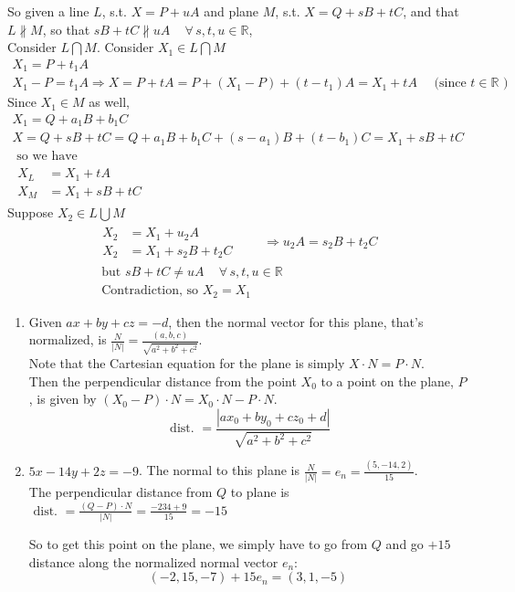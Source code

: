 \documentclass[twoside]{amsart}
\theoremstyle{plain}
\theoremstyle{definition}
\newcommand{\exercisehead}[1]
  {\smallskip
   \noindent{\small\bf Exercise #1.}}
\begin{document}
\exercisehead{18} So given a line $L$, s.t. $X = P + u A$ and plane $M$, s.t. $X = Q + sB + tC$, and that \\
$L \nparallel M$, so that $sB + tC \nparallel u A \quad \, \forall \, s, t, u \in \mathbb{R}$,  \\

Consider $L\bigcap M$.  Consider $X_1 \in L \bigcap M$
\[
\begin{gathered}
  X_1 = P + t_1 A \\
  X_1 - P = t_1 A \Longrightarrow X = P + tA = P + (X_1 - P) + (t-t_1) A = X_1 + t A \quad \text{ (since $t\in \mathbb{R}$ ) }
\end{gathered}
\]
Since $X_1 \in M$ as well, 
\[
\begin{gathered}
  X_1 = Q + a_1 B + b_1 C \\
  X = Q + sB + tC = Q + a_1 B + b_1 C + (s-a_1)B + (t-b_1)C = X_1 + sB + t C \\
  \text{ so we have } \\
  \begin{aligned}
    X_L & = X_1 + tA \\
    X_M & = X_1 + sB + tC 
  \end{aligned}
\end{gathered}
\]
Suppose $X_2 \in L \bigcup M$
\[
\begin{gathered}
  \begin{aligned}
    X_2 & = X_1 + u_2 A \\
    X_2 & = X_1 + s_2 B + t_2 C 
  \end{aligned} \quad \quad \Longrightarrow u_2 A = s_2 B + t_2 C \\
  \text{ but } sB + tC \neq u A \quad \, \forall \, s,t,u \in \mathbb{R} \\
  \text{ Contradiction, so $X_2 = X_1$ }
\end{gathered}
\]

\exercisehead{19}
\begin{enumerate}
\item Given $ax + by + cz = -d$, then the normal vector for this plane, that's normalized, is $\frac{ N}{|N|} = \frac{ (a,b,c)}{ \sqrt{ a^2 + b^2 + c^2 } }$.  \smallskip \\
Note that the Cartesian equation for the plane is simply $X \cdot N = P \cdot N$. \smallskip \\
Then the perpendicular distance from the point $X_0$ to a point on the plane, $P$, is given by $(X_0 - P) \cdot N = X_0 \cdot N - P \cdot N$.  
\[
\text{ dist. } = \frac{ |a x_0 + b y_0 + cz_0 + d | }{ \sqrt{ a^2 + b^2 + c^2 } }
\]
\item $5x - 14y + 2z = -9$.  The normal to this plane is $\frac{N}{|N|} = e_n = \frac{ (5,-14,2)}{15} $.  \smallskip \\
  The perpendicular distance from $Q$ to plane is $\text{ dist. } = \frac{ (Q-P)\cdot N}{ |N|} = \frac{ -234 + 9}{15 } = -15$ 

So to get this point on the plane, we simply have to go from $Q$ and go $+15$ distance along the normalized normal vector $e_n$:
\[
(-2,15,-7) + 15 e_n = \boxed{ (3,1,-5) }
\]
\end{enumerate}
\end{document}
